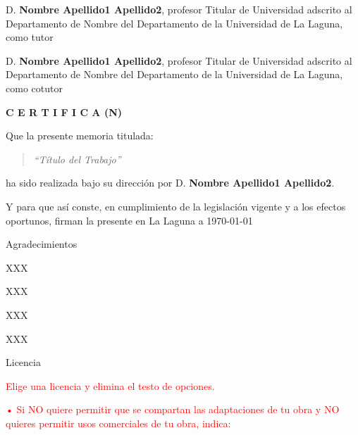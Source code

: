 \documentclass[a4paper,12pt,oneside]{scrbook}
\begin{document}
{
\setlength\parindent{0pt}
    D. \textbf{Nombre Apellido1 Apellido2}, profesor Titular de Universidad adscrito al Departamento de Nombre del Departamento de la Universidad de La Laguna, como tutor
    
    \bigskip
    D. \textbf{Nombre Apellido1 Apellido2}, profesor Titular de Universidad adscrito al Departamento de Nombre del Departamento de la Universidad de La Laguna, como cotutor\pagestyle{empty}
    
    \bigskip
    \bigskip
    \textbf{C E R T I F I C A (N)}

    \bigskip
    Que la presente memoria titulada:
    
    \bigskip
    \begin{quote}
    \textit{``Título del Trabajo''}
    \end{quote}
    
    \bigskip
    \noindent ha sido realizada bajo su dirección por D. \textbf{Nombre Apellido1 Apellido2}.
    
    \bigskip
    Y para que así conste, en cumplimiento de la legislación vigente y a los efectos
    oportunos, firman la presente en La Laguna a \today
}

\thispagestyle{empty}

\begin{flushright}
    \setlength{\parindent}{0mm}

    {\LARGE Agradecimientos}
    \vspace{8mm}
    
    \begin{large}
    XXX
    
    XXX
    
    XXX
    
    XXX
    
    \end{large}
\end{flushright}

\thispagestyle{empty}

{\noindent\LARGE Licencia}

\textcolor{red}{Elige una licencia y elimina el testo de opciones.}

\bigskip
\textcolor{red}{• Si NO quiere permitir que se compartan las adaptaciones de tu obra y NO quieres permitir usos comerciales de tu obra, indica:}
\end{document}
